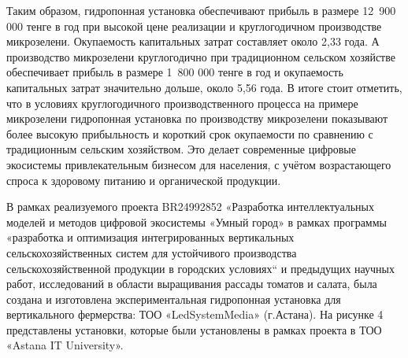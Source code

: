 
Таким образом, гидропонная установка обеспечивают прибыль в размере
12~900 000 тенге в год при высокой цене реализации и круглогодичном
производстве микрозелени. Окупаемость капитальных затрат составляет
около 2,33 года. А производство микрозелени круглогодично при
традиционном сельском хозяйстве обеспечивает прибыль в размере 1~800 000
тенге в год и окупаемость капитальных затрат значительно дольше, около
5,56 года. В итоге стоит отметить, что в условиях круглогодичного
производственного процесса на примере микрозелени гидропонная установка
по производству микрозелени показывают более высокую прибыльность и
короткий срок окупаемости по сравнению с традиционным сельским
хозяйством. Это делает современные цифровые экосистемы привлекательным
бизнесом для населения, с учётом возрастающего спроса к здоровому
питанию и органической продукции.

В рамках реализуемого проекта BR24992852 «Разработка интеллектуальных
моделей и методов цифровой экосистемы «Умный город» в рамках программы
«разработка и оптимизация интегрированных вертикальных
сельскохозяйственных систем для устойчивого производства
сельскохозяйственной продукции в городских условиях`` и предыдущих
научных работ, исследований в области выращивания рассады томатов и
салата, была создана и изготовлена экспериментальная гидропонная
установка для вертикального фермерства: ТОО «LedSystemMedia» (г.Астана).
На рисунке 4 представлены установки, которые были установлены в рамках
проекта в ТОО «Astana IT University».

